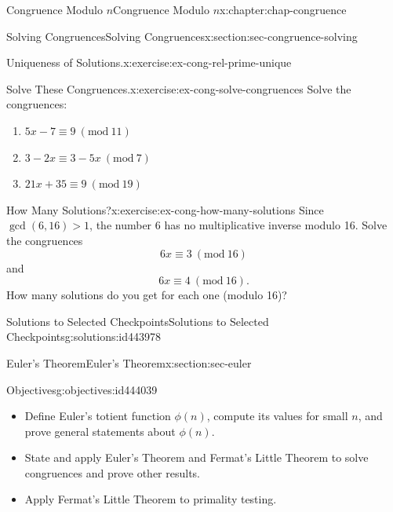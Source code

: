 \documentclass[oneside,10pt,]{book}
\numberwithin{equation}{section}
\newcommand{\Mod}[1]{\ \left(\mathrm{mod}\ #1\right)}
\newcommand{\gt}{>}
\begin{document}
\begin{chapterptx}{Congruence Modulo \(n\)}{}{Congruence Modulo \(n\)}{}{}{x:chapter:chap-congruence}
\begin{sectionptx}{Solving Congruences}{}{Solving Congruences}{}{}{x:section:sec-congruence-solving}
\begin{inlineexercise}{Uniqueness of Solutions.}{x:exercise:ex-cong-rel-prime-unique}
\end{inlineexercise}
\begin{inlineexercise}{Solve These Congruences.}{x:exercise:ex-cong-solve-congruences}%
Solve the congruences:%
\begin{enumerate}[label=(\alph*)]
\item{}\(\displaystyle 5x - 7 \equiv 9 \Mod{11}\)%
\item{}\(\displaystyle 3 - 2x \equiv 3 - 5x \Mod{7}\)%
\item{}\(\displaystyle 21x + 35 \equiv 9 \Mod{19}\)%
\end{enumerate}
%
\end{inlineexercise}
\begin{inlineexercise}{How Many Solutions?}{x:exercise:ex-cong-how-many-solutions}%
Since \(\gcd(6,16) \gt 1\), the number 6 has no multiplicative inverse modulo 16. Solve the congruences%
\begin{equation*}
6x \equiv 3 \Mod{16}
\end{equation*}
and%
\begin{equation*}
6x \equiv 4 \Mod{16}\text{.}
\end{equation*}
How many solutions do you get for each one (modulo 16)?%
\end{inlineexercise}
%
%
\typeout{************************************************}
\typeout{************************************************}
%
\begin{solutions-subsection}{Solutions to Selected Checkpoints}{}{Solutions to Selected Checkpoints}{}{}{g:solutions:id443978}
\end{solutions-subsection}
\end{sectionptx}
%
%
\typeout{************************************************}
\typeout{************************************************}
%
\begin{sectionptx}{Euler's Theorem}{}{Euler's Theorem}{}{}{x:section:sec-euler}
\begin{objectives}{Objectives}{g:objectives:id444039}
%
\begin{itemize}[label=\textbullet]
\item{}Define Euler's totient function \(\phi(n)\), compute its values for small \(n\), and prove general statements about \(\phi(n)\).%
\item{}State and apply Euler's Theorem and Fermat's Little Theorem to solve congruences and prove other results.%
\item{}Apply Fermat's Little Theorem to primality testing.%

\end{itemize}
\end{objectives}
\end{sectionptx}
\end{chapterptx}
\end{document}
